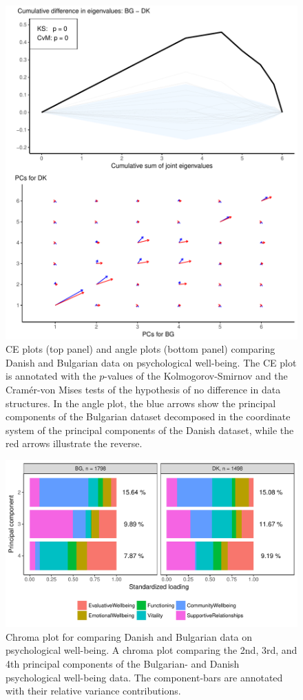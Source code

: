 \documentclass[a4paper,12pt]{article}
\begin{document}
\begin{figure}[H]
\center
\includegraphics[scale=0.8]{Figure6_v2.pdf}
\caption{CE plots (top panel) and angle plots (bottom panel) comparing Danish and Bulgarian data on psychological well-being. The CE plot is annotated with the $p$-values of the Kolmogorov-Smirnov and the Cram\'er-von Mises tests of the hypothesis of no difference in data structures. In the angle plot, the blue arrows show the principal components of the Bulgarian dataset decomposed in the coordinate system of the principal components of the Danish dataset, while the red arrows illustrate the reverse.}
\label{plotBG.cehair}
\end{figure}

\begin{figure}[H]
\center
\includegraphics[scale=0.8]{Figure7_v2.pdf}
\caption{Chroma plot for comparing Danish and Bulgarian data on psychological well-being. A chroma plot comparing the 2nd, 3rd, and 4th principal components of the Bulgarian- and Danish psychological well-being data. The component-bars are annotated with their relative variance contributions. }
\label{plotBG.pancake}
\end{figure}
\end{document}

